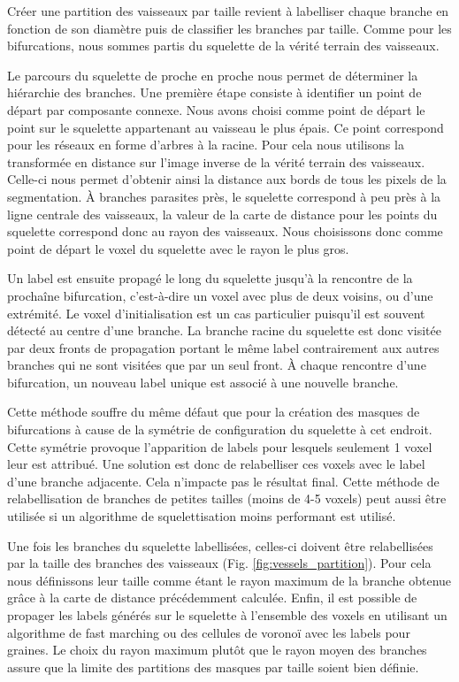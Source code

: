 Créer une partition des vaisseaux par taille revient à labelliser chaque branche en fonction de son diamètre puis de classifier les branches par taille. Comme pour les bifurcations, nous sommes partis du squelette de la vérité terrain des vaisseaux.

Le parcours du squelette de proche en proche nous permet de déterminer la hiérarchie des branches. Une première étape consiste à identifier un point de départ par composante connexe. Nous avons choisi comme point de départ le point sur le squelette appartenant au vaisseau le plus épais. Ce point correspond pour les réseaux en forme d'arbres à la racine. Pour cela nous utilisons la transformée en distance sur l'image inverse de la vérité terrain des vaisseaux. Celle-ci nous permet d'obtenir ainsi la distance aux bords de tous les pixels de la segmentation. À branches parasites près, le squelette correspond à peu près à la ligne centrale des vaisseaux, la valeur de la carte de distance pour les points du squelette correspond donc au rayon des vaisseaux. Nous choisissons donc comme point de départ le voxel du squelette avec le rayon le plus gros.

Un label est ensuite propagé le long du squelette jusqu'à la rencontre de la prochaîne bifurcation, c'est-à-dire un voxel avec plus de deux voisins, ou d'une extrémité. Le voxel d'initialisation est un cas particulier puisqu'il est souvent détecté au centre d'une branche. La branche racine du squelette est donc visitée par deux fronts de propagation portant le même label contrairement aux autres branches qui ne sont visitées que par un seul front. À chaque rencontre d'une bifurcation, un nouveau label unique est associé à une nouvelle branche.

Cette méthode souffre du même défaut que pour la création des masques de bifurcations à cause de la symétrie de configuration du squelette à cet endroit. Cette symétrie provoque l'apparition de labels pour lesquels seulement 1 voxel leur est attribué. Une solution est donc de relabelliser ces voxels avec le label d'une branche adjacente. Cela n'impacte pas le résultat final. Cette méthode de relabellisation de branches de petites tailles (moins de 4-5 voxels) peut aussi être utilisée si un algorithme de squelettisation moins performant est utilisé.

Une fois les branches du squelette labellisées, celles-ci doivent être relabellisées par la taille des branches des vaisseaux (Fig. \ref{fig:vessels_partition}). Pour cela nous définissons leur taille comme étant le rayon maximum de la branche obtenue grâce à la carte de distance précédemment calculée. Enfin, il est possible de propager les labels générés sur le squelette à l'ensemble des voxels en utilisant un algorithme de fast marching ou des cellules de voronoï avec les labels pour graines. Le choix du rayon maximum plutôt que le rayon moyen des branches assure que la limite des partitions des masques par taille soient bien définie.

